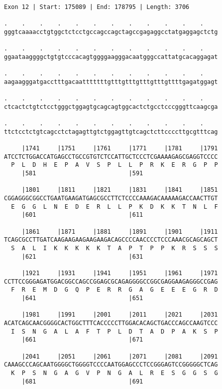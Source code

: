 \documentclass{article}
\begin{document}
\newpage
\begin{Verbatim}[fontfamily=courier]
Exon 12 | Start: 175089 | End: 178795 | Length: 3706

.    .    .    .    .    .    .    .    .    .    .    .    
gggtcaaaacctgtggctctcctgccagccagctagccgagaggcctatgaggagctctg

.    .    .    .    .    .    .    .    .    .    .    .    
ggaataaggggctgtgtcccacagtggggaagggacaatgggccattatgcacaggagat

.    .    .    .    .    .    .    .    .    .    .    .    
aagaagggatgacctttgacaatttttttgtttgtttgtttgtttgttttgagatggagt

.    .    .    .    .    .    .    .    .    .    .    .    
ctcactctgtctcctgggctggagtgcagcagtggcactctgcctcccgggttcaagcga

.    .    .    .    .    .    .    .    .    .    .    .    
ttctcctctgtcagcctctagagttgtctggagttgtcagctcttccccttgcgtttcag

     |1741     |1751     |1761     |1771     |1781     |1791
ATCCTCTGGACCATGAGCCTGCCGTGTCTCCATTGCTCCCTCGAAAAGAGCGAGGTCCCC
  P  L  D  H  E  P  A  V  S  P  L  L  P  R  K  E  R  G  P  P
     |581                          |591                     

     |1801     |1811     |1821     |1831     |1841     |1851
CGGAGGGCGGCCTGAATGAAGATGAGCGCCTTCTCCCCAAAGACAAAAAGACCAACTTGT
  E  G  G  L  N  E  D  E  R  L  L  P  K  D  K  K  T  N  L  F
     |601                          |611                     

     |1861     |1871     |1881     |1891     |1901     |1911
TCAGCGCCTTGATCAAGAAGAAGAAGAAGACAGCCCCAACCCCTCCCAAACGCAGCAGCT
  S  A  L  I  K  K  K  K  K  T  A  P  T  P  P  K  R  S  S  S
     |621                          |631                     

     |1921     |1931     |1941     |1951     |1961     |1971
CCTTCCGGGAGATGGACGGCCAGCCGGAGCGCAGAGGGGCCGGCGAGGAAGAGGGCCGAG
  F  R  E  M  D  G  Q  P  E  R  R  G  A  G  E  E  E  G  R  D
     |641                          |651                     

     |1981     |1991     |2001     |2011     |2021     |2031
ACATCAGCAACGGGGCACTGGCTTTCACCCCCTTGGACACAGCTGACCCAGCCAAGTCCC
  I  S  N  G  A  L  A  F  T  P  L  D  T  A  D  P  A  K  S  P
     |661                          |671                     

     |2041     |2051     |2061     |2071     |2081     |2091
CAAAGCCCAGCAATGGGGCTGGGGTCCCCAATGGAGCCCTCCGGGAGTCCGGGGGCTCAG
  K  P  S  N  G  A  G  V  P  N  G  A  L  R  E  S  G  G  S  G
     |681                          |691                     


\end{Verbatim}
\end{document}
